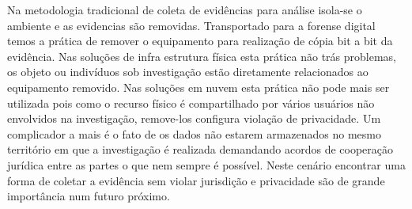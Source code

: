 Na metodologia tradicional de coleta de evidências para análise isola-se o ambiente e as evidencias são removidas. Transportado para a forense digital temos a prática de remover o equipamento para realização de cópia bit a bit da evidência.
%
Nas soluções de infra estrutura física esta prática não trás problemas, os objeto ou indivíduos sob investigação estão diretamente relacionados ao equipamento removido. 
%
Nas soluções em nuvem esta prática não pode mais ser utilizada pois como o recurso físico é compartilhado por vários usuários não envolvidos na investigação, remove-los configura violação de privacidade.
%
Um complicador a mais é o fato de os dados não estarem armazenados no mesmo território em que a investigação é realizada demandando acordos de cooperação jurídica entre as partes o que nem sempre é possível.
%
Neste cenário encontrar uma forma de coletar a evidência sem violar jurisdição e privacidade são de grande importância num futuro próximo.






